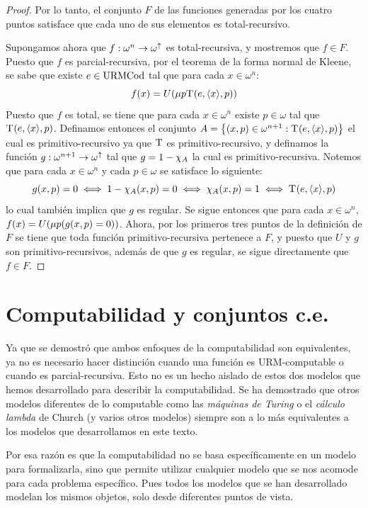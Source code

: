 \begin{proof}
	Por lo tanto, el conjunto $F$ de las funciones generadas por los cuatro puntos satisface que cada uno de sus elementos es total-recursivo.

	Supongamos ahora que $f:\omega^{n}\to\omega^{\uparrow}$ es total-recursiva, y mostremos que $f\in F$. Puesto que $f$ es parcial-recursiva, por el teorema de la forma normal de Kleene, se sabe que existe $e\in\mathrm{URMCod}$ tal que para cada $x\in\omega^{n}$:
	\[
		f\pa*{x} = U\pa*{\mu p \KLEENE\pa*{e,\inner*{x}, p}}
	\]
	Puesto que $f$ es total, se tiene que para cada $x\in\omega^{n}$ existe $p\in\omega$ tal que $\KLEENE\pa*{e,\inner*{x}, p}$. Definamos entonces el conjunto $A =\set*{\pa*{x, p}\in\omega^{n + 1}: \KLEENE\pa*{e,\inner*{x}, p}}$ el cual es primitivo-recursivo ya que $\mathrm{T}^{}$ es primitivo-recursivo, y definamos la función $g:\omega^{n + 1}\to\omega^{\uparrow}$ tal que $g = 1 -\chi_{A}$ la cual es primitivo-recursiva. Notemos que para cada $x\in\omega^{n}$ y cada $p\in\omega$ se satisface lo siguiente:
	\[
		g\pa*{x, p} = 0\iff 1 -\CARACTERISTICA{A}\pa*{x, p} = 0\iff\CARACTERISTICA{A}\pa*{x, p} = 1\iff \KLEENE\pa*{e,\inner*{x}, p}
	\]
	lo cual también implica que $g$ es regular. Se sigue entonces que para cada $x\in\omega^{n}$, $f\pa*{x} = U\pa*{\mu p\pa*{g\pa*{x, p} = 0}}$. Ahora, por los primeros tres puntos de la definición de $F$ se tiene que toda función primitivo-recursiva pertenece a $F$, y puesto que $U$ y $g$ son primitivo-recursivos, además de que $g$ es regular, se sigue directamente que $f\in F$.
\end{proof}

\section{Computabilidad y conjuntos c.e.}

Ya que se demostró que ambos enfoques de la computabilidad son equivalentes, ya no es necesario hacer distinción cuando una función es URM-computable o cuando es parcial-recursiva. Esto no es un hecho aislado de estos dos modelos que hemos desarrollado para describir la computabilidad. Se ha demostrado que otros modelos diferentes de lo computable como las \emph{máquinas de Turing} o el \emph{cálculo lambda} de Church (y varios otros modelos) siempre son a lo más equivalentes a los modelos que desarrollamos en este texto.

Por esa razón es que la computabilidad no se basa específicamente en un modelo para formalizarla, sino que permite utilizar cualquier modelo que se nos acomode para cada problema específico. Pues todos los modelos que se han desarrollado modelan los mismos objetos, solo desde diferentes puntos de vista.

